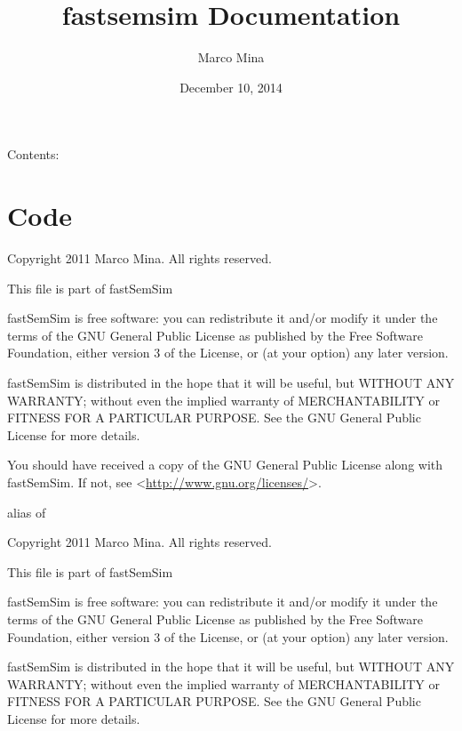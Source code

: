 \documentclass[letterpaper,10pt,english]{sphinxmanual}
\title{fastsemsim Documentation}
\date{December 10, 2014}
\author{Marco Mina}
\begin{document}
\maketitle
\tableofcontents
{}\label{index::doc}


Contents:


\chapter{Code}
\label{code:module-Ontology}\label{code:code}\label{code::doc}\label{code:welcome-to-fastsemsim-s-documentation}
Copyright 2011 Marco Mina. All rights reserved.

This file is part of fastSemSim

fastSemSim is free software: you can redistribute it and/or modify
it under the terms of the GNU General Public License as published by
the Free Software Foundation, either version 3 of the License, or
(at your option) any later version.

fastSemSim is distributed in the hope that it will be useful,
but WITHOUT ANY WARRANTY; without even the implied warranty of
MERCHANTABILITY or FITNESS FOR A PARTICULAR PURPOSE.  See the
GNU General Public License for more details.

You should have received a copy of the GNU General Public License
along with fastSemSim.  If not, see \textless{}\href{http://www.gnu.org/licenses/}{http://www.gnu.org/licenses/}\textgreater{}.

\begin{fulllineitems}
\label{code:Ontology.Ontology}
alias of {\hyperref[code:Ontology.Ontology]{}}

\end{fulllineitems}

\label{code:module-SemSim}
Copyright 2011 Marco Mina. All rights reserved.

This file is part of fastSemSim

fastSemSim is free software: you can redistribute it and/or modify
it under the terms of the GNU General Public License as published by
the Free Software Foundation, either version 3 of the License, or
(at your option) any later version.

fastSemSim is distributed in the hope that it will be useful,
but WITHOUT ANY WARRANTY; without even the implied warranty of
MERCHANTABILITY or FITNESS FOR A PARTICULAR PURPOSE.  See the
GNU General Public License for more details.
\end{document}
